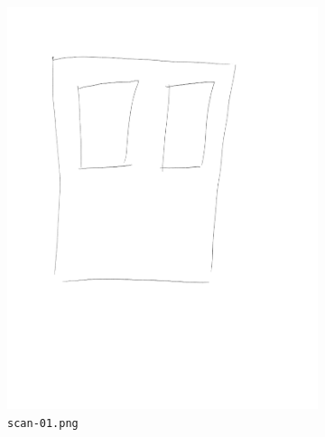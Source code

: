 \documentclass{article}
\begin{document}
\begin{figure}[h]
\begin{center}
    \begin{subfigure}[b]{0.3\textwidth}
        \includegraphics[width=\textwidth]{../examples/scan-01.png}
        \caption{\texttt{scan-01.png}}
    \end{subfigure}
    \begin{subfigure}[b]{0.3\textwidth}

\end{subfigure}
\end{center}
\end{figure}
\end{document}
